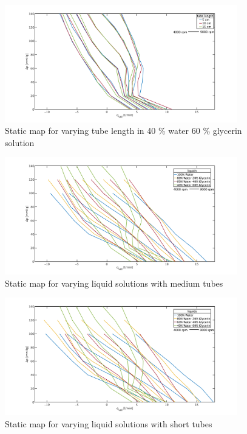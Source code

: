 \begin{figure}[ht]
  \includegraphics[width=0.9\textwidth]{images/plots_syst_ident/40w60g_tube_length_new.pdf}
  \caption[Static map for different tube length in 40 \% water 60 \% glycerin solution]{Static map for varying tube length in 40 \% water 60 \% glycerin solution}
    \label{fig:anh_3}
\end{figure}

\begin{figure}[ht]
  \includegraphics[width=0.9\textwidth]{images/plots_syst_ident/medium_liquid_change_new.pdf}
  \caption[Static map for varying liquid solutions with medium tubes]{Static map for varying liquid solutions with medium tubes}
    \label{fig:anh_4}
\end{figure}

\begin{figure}[ht]
  \includegraphics[width=0.9\textwidth]{images/plots_syst_ident/short_liquid_change_new.pdf}
  \caption[Static map for varying liquid solutions with short tubes]{Static map for varying liquid solutions with short tubes}
    \label{fig:anh_5}
\end{figure}
